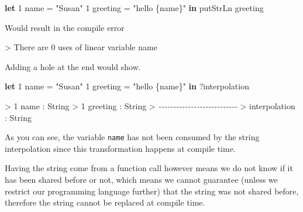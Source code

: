 \documentclass[
]{article}
\newenvironment{Shaded}{}{}
\newcommand{\CommentTok}[1]{\textcolor[rgb]{0.38,0.63,0.69}{\textit{#1}}}
\newcommand{\DataTypeTok}[1]{\textcolor[rgb]{0.56,0.13,0.00}{#1}}
\newcommand{\DecValTok}[1]{\textcolor[rgb]{0.25,0.63,0.44}{#1}}
\newcommand{\FunctionTok}[1]{\textcolor[rgb]{0.02,0.16,0.49}{#1}}
\newcommand{\KeywordTok}[1]{\textcolor[rgb]{0.00,0.44,0.13}{\textbf{#1}}}
\newcommand{\NormalTok}[1]{#1}
\newcommand{\OperatorTok}[1]{\textcolor[rgb]{0.40,0.40,0.40}{#1}}
\newcommand{\OtherTok}[1]{\textcolor[rgb]{0.00,0.44,0.13}{#1}}
\newcommand{\StringTok}[1]{\textcolor[rgb]{0.25,0.44,0.63}{#1}}
\begin{document}
\begin{Shaded}
\begin{Highlighting}[]
\KeywordTok{let} \DecValTok{1}\NormalTok{ name }\OtherTok{=} \StringTok{"Susan"}
    \DecValTok{1}\NormalTok{ greeting }\OtherTok{=} \StringTok{"hello \{name\}"} \KeywordTok{in}
    \FunctionTok{putStrLn}\NormalTok{ greeting}
\end{Highlighting}
\end{Shaded}

Would result in the compile error

\begin{Shaded}
\begin{Highlighting}[]
\OperatorTok{\textgreater{}}\NormalTok{ There are }\DecValTok{0}\NormalTok{ uses of linear variable name}
\end{Highlighting}
\end{Shaded}

Adding a hole at the end would show.

\begin{Shaded}
\begin{Highlighting}[]
\KeywordTok{let} \DecValTok{1}\NormalTok{ name }\OtherTok{=} \StringTok{"Susan"}
    \DecValTok{1}\NormalTok{ greeting }\OtherTok{=} \StringTok{"hello \{name\}"} \KeywordTok{in}
    \OperatorTok{?}\NormalTok{interpolation}
\end{Highlighting}
\end{Shaded}

\begin{Shaded}
\begin{Highlighting}[]
\OperatorTok{\textgreater{}} \DecValTok{1}\NormalTok{ name }\OperatorTok{:} \DataTypeTok{String}
\OperatorTok{\textgreater{}} \DecValTok{1}\NormalTok{ greeting }\OperatorTok{:} \DataTypeTok{String}
\OperatorTok{\textgreater{}} \CommentTok{{-}{-}{-}{-}{-}{-}{-}{-}{-}{-}{-}{-}{-}{-}{-}{-}{-}{-}{-}{-}{-}{-}{-}{-}{-}{-}{-}}
\OperatorTok{\textgreater{}}\NormalTok{ interpolation }\OperatorTok{:} \DataTypeTok{String}
\end{Highlighting}
\end{Shaded}

As you can see, the variable \texttt{name} has not been consumed by the
string interpolation since this transformation happens at compile time.

Having the string come from a function call however means we do not know
if it has been shared before or not, which means we cannot guarantee
(unless we restrict our programming language further) that the string
was not shared before, therefore the string cannot be replaced at
compile time.
\end{document}
